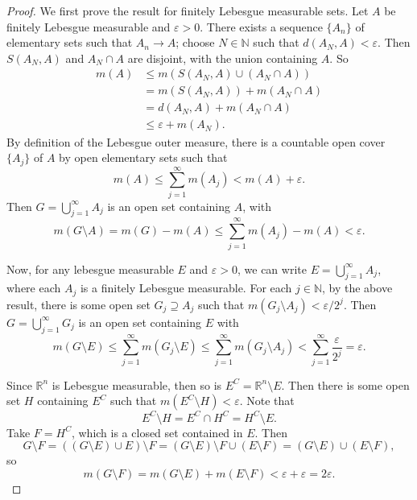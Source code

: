 \documentclass[12pt]{article}
\newcommand{\N}{\mathbb{N}}
\newcommand{\R}{\mathbb{R}}
\newcommand{\eps}{\varepsilon}
\newcommand{\<}{\langle}
\renewcommand{\>}{\rangle}
\begin{document}
\begin{proof}
    We first prove the result for finitely Lebesgue measurable sets. Let $A$ be finitely Lebesgue measurable and $\eps > 0$. There exists a sequence $\{A_n\}$ of elementary sets such that $A_n \to A$; choose $N \in \N$ such that $d(A_N , A) < \eps$. Then $S(A_N, A)$ and $A_N \cap A$ are disjoint, with the union containing $A$. So
    \begin{align*}
        m(A)
            &\leq m(S(A_N, A) \cup (A_N \cap A)) \\
            &= m(S(A_N, A)) + m(A_N \cap A) \\
            &= d(A_N, A) + m(A_N \cap A) \\
            &\leq \eps + m(A_N).
    \end{align*}
    By definition of the Lebesgue outer measure, there is a countable open cover $\{A_j\}$ of $A$ by open elementary sets such that
    \[
        m(A) \leq \sum_{j=1}^{\infty} m(A_j) < m(A) + \eps.
    \]
    Then $G = \bigcup_{j=1}^{\infty} A_j$ is an open set containing $A$, with
    \[
        m(G \setminus A) = m(G) - m(A) \leq \sum_{j=1}^{\infty} m(A_j) - m(A) < \eps.
    \]

    Now, for any lebesgue measurable $E$ and $\eps > 0$, we can write $E = \bigcup_{j=1}^{\infty} A_j$, where each $A_j$ is a finitely Lebesgue measurable. For each $j \in \N$, by the above result, there is some open set $G_j \supseteq A_j$ such that $m(G_j \setminus A_j) < \eps/2^j$. Then $G = \bigcup_{j=1}^{\infty} G_j$ is an open set containing $E$ with
    \[
        m(G \setminus E) 
            \leq \sum_{j=1}^{\infty} m(G_j \setminus E)
            \leq \sum_{j=1}^{\infty} m(G_j \setminus A_j)
            < \sum_{j=1}^{\infty} \frac{\eps}{2^j}
            = \eps.
    \]

    Since $\R^n$ is Lebesgue measurable, then so is $E^C = \R^n \setminus E$. Then there is some open set $H$ containing $E^C$ such that $m(E^C \setminus H) < \eps$. Note that
    \[
        E^C \setminus H = E^C \cap H^C  = H^C \setminus E.
    \]
    Take $F = H^C$, which is a closed set contained in $E$. Then
    \[
        G \setminus F
            = ((G \setminus E) \cup E) \setminus F
            = (G \setminus E) \setminus F \cup (E \setminus F)
            = (G \setminus E) \cup (E \setminus F),
    \]
    so
    \[
        m(G \setminus F) = m(G \setminus E) + m(E \setminus F) < \eps + \eps = 2\eps.
    \]

\end{proof}
\end{document}
